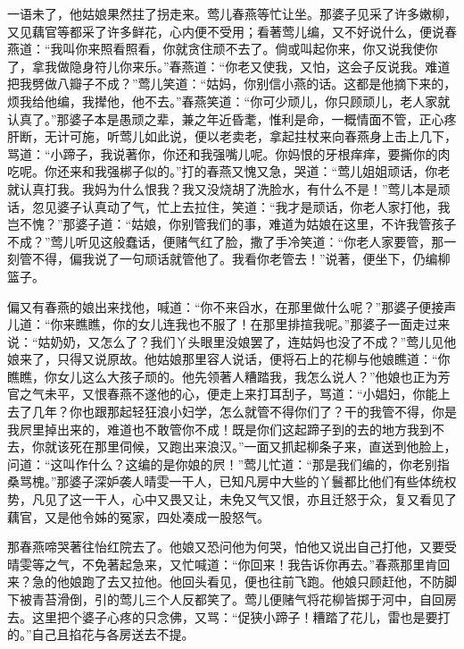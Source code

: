 \begin{parag}


    一语未了，他姑娘果然拄了拐走来。莺儿春燕等忙让坐。那婆子见采了许多嫩柳，又见藕官等都采了许多鲜花，心内便不受用；看著莺儿编，又不好说什么，便说春燕道：“我叫你来照看照看，你就贪住顽不去了。倘或叫起你来，你又说我使你了，拿我做隐身符儿你来乐。”春燕道：“你老又使我，又怕，这会子反说我。难道把我劈做八瓣子不成？”莺儿笑道：“姑妈，你别信小燕的话。这都是他摘下来的，烦我给他编，我撵他，他不去。”春燕笑道：“你可少顽儿，你只顾顽儿，老人家就认真了。”那婆子本是愚顽之辈，兼之年近昏耄，惟利是命，一概情面不管，正心疼肝断，无计可施，听莺儿如此说，便以老卖老，拿起拄杖来向春燕身上击上几下，骂道：“小蹄子，我说著你，你还和我强嘴儿呢。你妈恨的牙根痒痒，要撕你的肉吃呢。你还来和我强梆子似的。”打的春燕又愧又急，哭道：“莺儿姐姐顽话，你老就认真打我。我妈为什么恨我？我又没烧胡了洗脸水，有什么不是！”莺儿本是顽话，忽见婆子认真动了气，忙上去拉住，笑道：“我才是顽话，你老人家打他，我岂不愧？”那婆子道：“姑娘，你别管我们的事，难道为姑娘在这里，不许我管孩子不成？”莺儿听见这般蠢话，便赌气红了脸，撒了手冷笑道：“你老人家要管，那一刻管不得，偏我说了一句顽话就管他了。我看你老管去！”说著，便坐下，仍编柳篮子。
\end{parag}


\begin{parag}


    偏又有春燕的娘出来找他，喊道：“你不来舀水，在那里做什么呢？”那婆子便接声儿道：“你来瞧瞧，你的女儿连我也不服了！在那里排揎我呢。”那婆子一面走过来说：“姑奶奶，又怎么了？我们丫头眼里没娘罢了，连姑妈也没了不成？”莺儿见他娘来了，只得又说原故。他姑娘那里容人说话，便将石上的花柳与他娘瞧道：“你瞧瞧，你女儿这么大孩子顽的。他先领著人糟踏我，我怎么说人？”他娘也正为芳官之气未平，又恨春燕不遂他的心，便走上来打耳刮子，骂道：“小娼妇，你能上去了几年？你也跟那起轻狂浪小妇学，怎么就管不得你们了？干的我管不得，你是我屄里掉出来的，难道也不敢管你不成！既是你们这起蹄子到的去的地方我到不去，你就该死在那里伺候，又跑出来浪汉。”一面又抓起柳条子来，直送到他脸上，问道：“这叫作什么？这编的是你娘的屄！”莺儿忙道：“那是我们编的，你老别指桑骂槐。”那婆子深妒袭人晴雯一干人，已知凡房中大些的丫鬟都比他们有些体统权势，凡见了这一干人，心中又畏又让，未免又气又恨，亦且迁怒于众，复又看见了藕官，又是他令姊的冤家，四处凑成一股怒气。
\end{parag}


\begin{parag}


    那春燕啼哭著往怡红院去了。他娘又恐问他为何哭，怕他又说出自己打他，又要受晴雯等之气，不免著起急来，又忙喊道：“你回来！我告诉你再去。”春燕那里肯回来？急的他娘跑了去又拉他。他回头看见，便也往前飞跑。他娘只顾赶他，不防脚下被青苔滑倒，引的莺儿三个人反都笑了。莺儿便赌气将花柳皆掷于河中，自回房去。这里把个婆子心疼的只念佛，又骂：“促狭小蹄子！糟踏了花儿，雷也是要打的。”自己且掐花与各房送去不提。
\end{parag}


